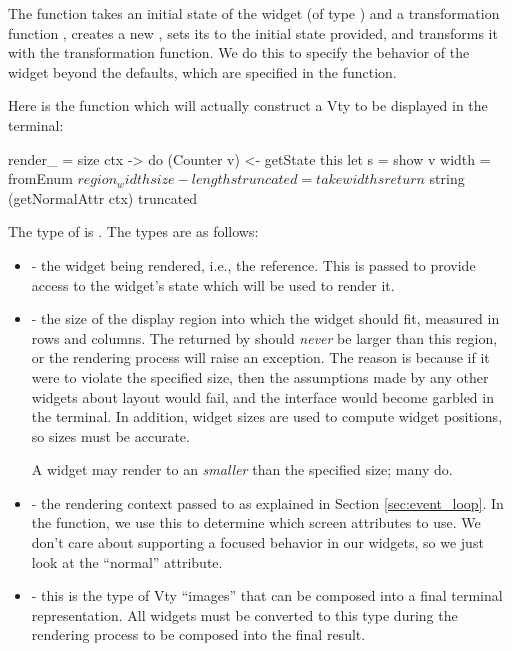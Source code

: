 The  function takes an initial state of the widget (of
type ) and a transformation function , creates a new , sets its  to
the initial state provided, and transforms it with the transformation
function.  We do this to specify the behavior of the widget beyond the
defaults, which are specified in the  function.

Here is the  function which will actually construct a Vty
 to be displayed in the terminal:

\begin{haskellcode}
 render_ =
   \this size ctx -> do
     (Counter v) <- getState this
     let s = show v
         width = fromEnum $ region_width size - length s
         truncated = take width s
     return $ string (getNormalAttr ctx) truncated
\end{haskellcode}

The type of  is .  The types are as follows:

\begin{itemize}
\item {} - the widget being rendered, i.e., the  reference.  This is passed to provide access to the
  widget's state which will be used to render it.
\item {} - the size of the display region into which
  the widget should fit, measured in rows and columns.  The 
  returned by  should \textit{never} be larger than this
  region, or the rendering process will raise an exception.  The
  reason is because if it were to violate the specified size, then the
  assumptions made by any other widgets about layout would fail, and
  the interface would become garbled in the terminal.  In addition,
  widget sizes are used to compute widget positions, so sizes must be
  accurate.

  A widget may render to an  \textit{smaller} than the
  specified size; many do.
\item {} - the rendering context passed to 
  as explained in Section \ref{sec:event_loop}.  In the 
  function, we use this to determine which screen attributes to use.
  We don't care about supporting a focused behavior in our
   widgets, so we just look at the ``normal'' attribute.
\item {} - this is the type of Vty ``images'' that can be
  composed into a final terminal representation.  All widgets must be
  converted to this type during the rendering process to be composed
  into the final result.
\end{itemize}

